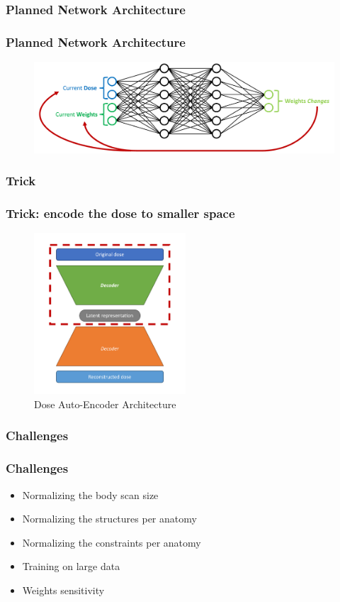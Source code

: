 \documentclass{beamer}
\begin{document}
	\subsubsection{Planned Network Architecture}
	\begin{frame}
		\frametitle{Planned Network Architecture}
		\begin{figure}
			\includegraphics[width=\linewidth]{vector_images/rl_architecture.pdf}
		\end{figure}
	\end{frame}
	\subsubsection{Trick}
	\begin{frame}
		\frametitle{Trick: encode the dose to smaller space}
		\begin{figure}
			\includegraphics[height=6cm]{vector_images/dose_ae.pdf}
			\caption{Dose Auto-Encoder Architecture}
		\end{figure}
	\end{frame}
	\subsubsection{Challenges}
	\begin{frame}
		\frametitle{Challenges}
		\begin{itemize}
			\item Normalizing the body scan size
			\item Normalizing the structures per anatomy
			\item Normalizing the constraints per anatomy
			\item Training on large data
			\item Weights sensitivity
		\end{itemize}
	\end{frame}
	
\end{document}
